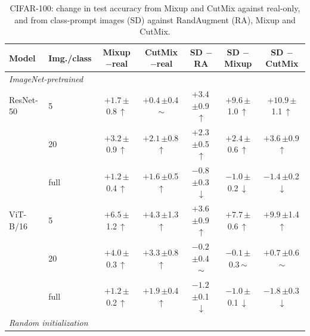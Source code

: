 \begin{table}[htbp]
\centering
\footnotesize
\setlength{\tabcolsep}{4pt}
\caption{CIFAR-100: change in test accuracy from Mixup and CutMix against real-only, and from class-prompt images (SD) against RandAugment (RA), Mixup and CutMix.}
\label{tab:paper-mixing}
\begin{tabular}{llccccc}
\toprule
Model & Img./class & \shortstack{Mixup\\$-$real} & \shortstack{CutMix\\$-$real} & \shortstack{SD\\$-$RA} & \shortstack{SD\\$-$Mixup} & \shortstack{SD\\$-$CutMix} \\
\midrule
\multicolumn{7}{l}{\textit{ImageNet-pretrained}} \\
ResNet-50 & 5 & $+1.7$\,{\scriptsize$\pm$0.8}\,$\uparrow$ & $+0.4$\,{\scriptsize$\pm$0.4}\,$\sim$ & $+3.4$\,{\scriptsize$\pm$0.9}\,$\uparrow$ & $+9.6$\,{\scriptsize$\pm$1.0}\,$\uparrow$ & $+10.9$\,{\scriptsize$\pm$1.1}\,$\uparrow$ \\
 & 20 & $+3.2$\,{\scriptsize$\pm$0.9}\,$\uparrow$ & $+2.1$\,{\scriptsize$\pm$0.8}\,$\uparrow$ & $+2.3$\,{\scriptsize$\pm$0.5}\,$\uparrow$ & $+2.4$\,{\scriptsize$\pm$0.6}\,$\uparrow$ & $+3.6$\,{\scriptsize$\pm$0.9}\,$\uparrow$ \\
 & full & $+1.2$\,{\scriptsize$\pm$0.4}\,$\uparrow$ & $+1.6$\,{\scriptsize$\pm$0.5}\,$\uparrow$ & $-0.8$\,{\scriptsize$\pm$0.3}\,$\downarrow$ & $-1.0$\,{\scriptsize$\pm$0.2}\,$\downarrow$ & $-1.4$\,{\scriptsize$\pm$0.2}\,$\downarrow$ \\
\addlinespace[2pt]
ViT-B/16 & 5 & $+6.5$\,{\scriptsize$\pm$1.2}\,$\uparrow$ & $+4.3$\,{\scriptsize$\pm$1.3}\,$\uparrow$ & $+3.6$\,{\scriptsize$\pm$0.9}\,$\uparrow$ & $+7.7$\,{\scriptsize$\pm$0.6}\,$\uparrow$ & $+9.9$\,{\scriptsize$\pm$1.4}\,$\uparrow$ \\
 & 20 & $+4.0$\,{\scriptsize$\pm$0.3}\,$\uparrow$ & $+3.3$\,{\scriptsize$\pm$0.8}\,$\uparrow$ & $-0.2$\,{\scriptsize$\pm$0.4}\,$\sim$ & $-0.1$\,{\scriptsize$\pm$0.3}\,$\sim$ & $+0.7$\,{\scriptsize$\pm$0.6}\,$\sim$ \\
 & full & $+1.2$\,{\scriptsize$\pm$0.2}\,$\uparrow$ & $+1.9$\,{\scriptsize$\pm$0.4}\,$\uparrow$ & $-1.2$\,{\scriptsize$\pm$0.1}\,$\downarrow$ & $-1.0$\,{\scriptsize$\pm$0.1}\,$\downarrow$ & $-1.8$\,{\scriptsize$\pm$0.3}\,$\downarrow$ \\
\midrule
\multicolumn{7}{l}{\textit{Random initialization}} \\

\end{tabular}
\end{table}
